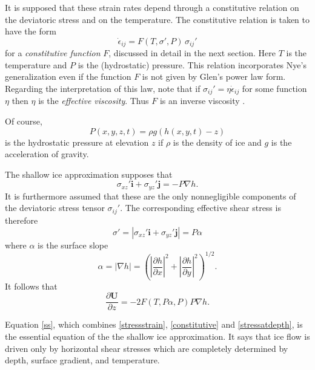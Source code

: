 \documentclass{amsart}%
\theoremstyle{plain}
\theoremstyle{definition}
\theoremstyle{remark}
\newcommand{\ddx}[1]{\ensuremath{\frac{\partial #1}{\partial x}}}
\newcommand{\ddy}[1]{\ensuremath{\frac{\partial #1}{\partial y}}}
\newcommand{\ddz}[1]{\ensuremath{\frac{\partial #1}{\partial z}}}
\def\eps{\epsilon}
\newcommand{\grad}{\nabla}
\newcommand{\ihat}{\mathbf{i}}
\newcommand{\jhat}{\mathbf{j}}
\newcommand{\bU}{{\mathbf{U}}}
\begin{document}
It is supposed \cite{Fowler,Greve,Hutter93} that these strain rates depend through a constitutive relation on the deviatoric stress and on the temperature.  The constitutive relation is taken to have the form
\begin{equation}\label{constitutive}
\dot\eps_{ij}=F(T,\sigma',P)\,\sigma_{ij}'
\end{equation}
for a \emph{constitutive function} $F$, discussed in detail in the next section.  Here $T$ is the temperature and $P$ is the (hydrostatic) pressure.  This relation incorporates Nye's generalization \cite{Nye} even if the function $F$ is not given by Glen's power law \cite{Glen} form.  Regarding the interpretation of this law, note that if $\sigma_{ij}'=\eta \dot\eps_{ij}$ for some function $\eta$ then $\eta$ is the \emph{effective viscosity}.  Thus $F$ is an inverse viscosity \cite{Fowler}.

Of course,
\begin{equation}\label{pressure}
P(x,y,z,t)=\rho g (h(x,y,t)-z)
\end{equation}
is the hydrostatic pressure at elevation $z$ if $\rho$ is the density of ice and $g$ is the acceleration of gravity.

The shallow ice approximation supposes that
\begin{equation}\label{stressatdepth}
\sigma_{xz}' \ihat + \sigma_{yz}' \jhat = -P\grad h.
\end{equation}
It is furthermore assumed that these are the only nonnegligible components of the deviatoric stress tensor $\sigma_{ij}'$.  The corresponding effective shear stress is therefore
\begin{equation}\label{effstress}
\sigma' = |\sigma_{xz}' \ihat + \sigma_{yz}' \jhat| = P \alpha
\end{equation}
where $\alpha$ is the surface slope
    $$\alpha = |\grad h| = \left(\left|\ddx{h}\right|^2 + \left|\ddy{h}\right|^2\right)^{1/2}.$$
It follows that
\begin{equation}\label{ss}
\ddz{\bU}=-2 F(T,P\alpha,P) P \grad h.
\end{equation}

Equation \eqref{ss}, which combines \eqref{stressstrain}, \eqref{constitutive} and \eqref{stressatdepth}, is the essential equation of the the shallow ice approximation.  It says that ice flow is driven only by horizontal shear stresses which are completely determined by depth, surface gradient, and temperature.
\end{document}

